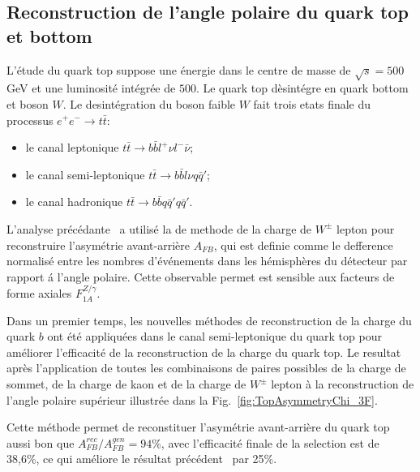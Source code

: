 \newpage
\subsection*{Reconstruction de l'angle polaire du quark top et bottom}
L’\'etude du quark top suppose une \'energie dans le centre de masse de $\sqrt{s} = 500$\,GeV et une luminosit\'e int\'egr\'ee de $500$\ifb. 
Le quark top d\`esint\'egre en quark bottom et boson $W$. Le desint\'egration du boson faible $W$ fait trois etats finale du processus $e^+e^-\to t\bar{t}$:
\begin{itemize}
	\item le canal leptonique $ t\bar{t} \to b\bar{b} l^+ \nu l^- \bar{\nu}$;
	\item le canal semi-leptonique $ t\bar{t} \to b\bar{b} l \nu q \bar{q}'$;
	\item le canal hadronique $ t\bar{t} \to b\bar{b} q \bar{q}' q \bar{q}'$.
\end{itemize}
 L'analyse précédante~\cite{bib:ILCTOP} a utilisé la de methode de la charge de $W^\pm$ lepton pour reconstruire  l'asymétrie avant-arrière $A_ {FB}$, qui est definie comme le defference normalisé entre les nombres d’\'ev\'enements dans les h\'emisph\`eres du d\'etecteur par rapport \'a l'angle polaire.  Cette observable permet est sensible aux facteurs de forme axiales $F_{1A}^{Z/\gamma}$.


Dans un premier temps, les nouvelles méthodes de reconstruction de la charge du quark $b$ ont été appliquées dans le canal semi-leptonique du quark top pour améliorer l'efficacit\'e de la reconstruction de la charge du quark top.
Le resultat après l'application de toutes les combinaisons de paires possibles de la charge de sommet, de la charge de kaon et de la charge de $W^\pm$ lepton à la reconstruction de l'angle polaire supérieur illustrée dans la Fig.~\ref {fig:TopAsymmetryChi_3F}.

Cette méthode permet de reconstituer l'asymétrie avant-arrière du quark top aussi bon que $A_ {FB}^{rec} / A^{gen}_{FB} = 94\%$, avec l'efficacité finale de la selection est de 38,6\%, ce qui améliore le résultat précédent~\cite{bib:ILCTOP} par 25\%.

